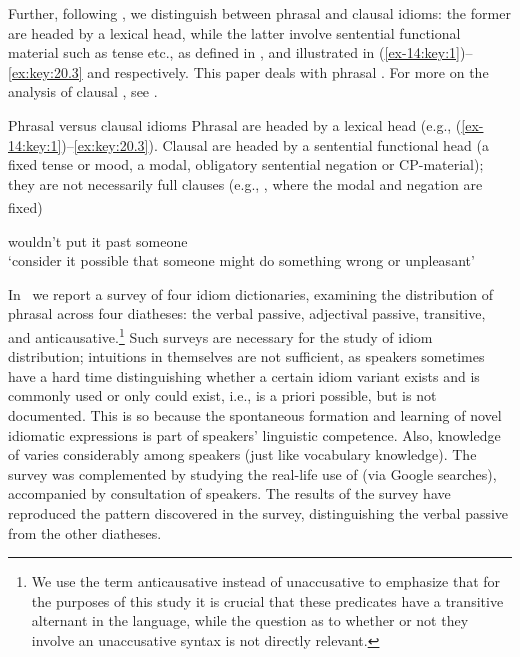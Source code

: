 \documentclass[output=paper]{langsci/langscibook}
\begin{document}
Further, following \textcite{HorSil2017,HorSil2019}, we distinguish between
phrasal and clausal idioms: the former are headed by a lexical head, while the
latter involve sentential functional material such as tense etc., as defined in
, and illustrated in (\ref{ex-14:key:1})--\eqref{ex:key:20.3} and 
respectively.  This paper deals with phrasal . For more on the
analysis of clausal , see \textcite{HorSil2019}.\newpage

\ea\label{ex:key:20.4}Phrasal versus clausal idioms
    \ea Phrasal  are headed by a lexical head (e.g., (\ref{ex-14:key:1})--\eqref{ex:key:20.3}).
    \ex Clausal  are headed by a sentential functional head (a fixed
    tense or mood, a modal, obligatory sentential negation or
    CP-material); they are not necessarily full clauses (e.g.,
    , where the modal and negation are
    fixed)\textsuperscript{}
    \z
\z

\ea\label{ex:key:20.5}
    wouldn’t put it past  someone\\
    ‘consider it possible that someone might do something wrong or unpleasant’
\z

In~ we report a survey of four  idiom dictionaries,
examining the distribution of phrasal  across four diatheses: the verbal
passive, adjectival passive, transitive, and anticausative.\footnote{We use the
    term anticausative instead of unaccusative to emphasize that for the
    purposes of this study it is crucial that these predicates have a
transitive alternant in the language, while the question as to whether or not
they involve an unaccusative syntax is not directly relevant.} Such surveys are
necessary for the study of idiom distribution; intuitions in themselves are not
sufficient, as speakers sometimes have a hard time distinguishing whether a
certain idiom variant exists and is commonly used or only could exist, i.e., is
a priori possible, but is not documented. This is so because the spontaneous
formation and learning of novel idiomatic expressions is part of speakers’
linguistic competence. Also, knowledge of  varies considerably among
speakers (just like vocabulary knowledge). The survey was complemented by
studying the real-life use of  (via Google searches), accompanied by
consultation of speakers. The results of the survey have reproduced the pattern
discovered in the  survey, distinguishing the verbal passive from
the other diatheses.
\end{document}
